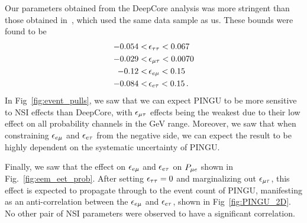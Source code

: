 Our parameters obtained from the DeepCore analysis was more stringent than those obtained in~\cite{demidov}, which used the same data sample as us.
These bounds were found to be 
\begin{align}
    -0.054 <&\, \epsilon_{\tau\tau} < 0.067 \nonumber \\
    -0.029 <&\, \epsilon_{\mu\tau} < 0.0070 \nonumber \\
    -0.12 <&\, \epsilon_{e\mu} < 0.15 \nonumber \\
    -0.084 <&\, \epsilon_{e\tau} < 0.15\,.
 \end{align}
In Fig~\ref{fig:event_pulls}, we saw that we can expect PINGU to be more sensitive to NSI effects than DeepCore, with $\epsilon_{\mu\tau}$ effects being the weakest 
due to their low effect on all probability channels in the \si{\GeV} range. Moreover, we saw that when constraining $\epsilon_{e\mu}$ and $\epsilon_{e\tau}$ from the negative side, 
we can expect the result to be highly dependent on the systematic uncertainty of PINGU.

Finally, we saw that the effect on $\epsilon_{e\mu}$ and $\epsilon_{e\tau}$ on $P_{\mu e}$ shown in Fig.~\ref{fig:eem_eet_prob}.
After setting $\epsilon_{\tau\tau}=0$ and marginalizing out $\epsilon_{\mu\tau}$, this effect is expected to propagate through to the event count of PINGU, 
manifesting as an anti-correlation between the $\epsilon_{e\mu}$ and $\epsilon_{e\tau}$, shown in Fig~\ref{fig:PINGU_2D}. No other pair of NSI parameters were observed to have 
a significant correlation.